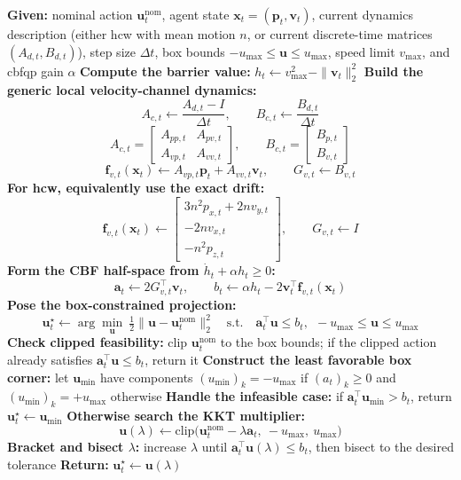 \begin{algorithm}[H]
\footnotesize
\caption{Velocity \acs{cbfqp} Saturation Filter}
\label{alg:velocity-cbf-qp}
\begin{algorithmic}[1]
\State \textbf{Given:} nominal action $\mathbf{u}_t^{\mathrm{nom}}$, agent state $\mathbf{x}_t=(\mathbf{p}_t,\mathbf{v}_t)$, current dynamics description (either \acs{hcw} with mean motion $n$, or current discrete-time matrices $(A_{d,t},B_{d,t})$), step size $\Delta t$, box bounds $-u_{\max}\le \mathbf{u}\le u_{\max}$, speed limit $v_{\max}$, and \acs{cbfqp} gain $\alpha$
\State \textbf{Compute the barrier value:} $h_t \leftarrow v_{\max}^2-\|\mathbf{v}_t\|_2^2$
\State \textbf{Build the generic local velocity-channel dynamics:}
\[
A_{c,t}\leftarrow \frac{A_{d,t}-I}{\Delta t},\qquad
B_{c,t}\leftarrow \frac{B_{d,t}}{\Delta t}
\]
\[
A_{c,t} =
\begin{bmatrix}
A_{pp,t} & A_{pv,t}\\
A_{vp,t} & A_{vv,t}
\end{bmatrix},
\qquad
B_{c,t} =
\begin{bmatrix}
B_{p,t}\\
B_{v,t}
\end{bmatrix}
\]
\[
\mathbf{f}_{v,t}(\mathbf{x}_t)\leftarrow
A_{vp,t}\mathbf{p}_t + A_{vv,t}\mathbf{v}_t,
\qquad
G_{v,t}\leftarrow B_{v,t}
\]
\State \textbf{For \acs{hcw}, equivalently use the exact drift:}
\[
\mathbf{f}_{v,t}(\mathbf{x}_t)\leftarrow
\begin{bmatrix}
3n^2 p_{x,t}+2n v_{y,t}\\
-2n v_{x,t}\\
-n^2 p_{z,t}
\end{bmatrix},
\qquad
G_{v,t}\leftarrow I
\]
\State \textbf{Form the CBF half-space from $\dot h_t+\alpha h_t\ge 0$:}
\[
\mathbf{a}_t \leftarrow 2G_{v,t}^\top\mathbf{v}_t,
\qquad
b_t \leftarrow \alpha h_t - 2 \mathbf{v}_t^\top \mathbf{f}_{v,t}(\mathbf{x}_t)
\]
\State \textbf{Pose the box-constrained projection:}
\[
\mathbf{u}_t^\star \leftarrow
\arg\min_{\mathbf{u}}\ \tfrac12\|\mathbf{u}-\mathbf{u}_t^{\mathrm{nom}}\|_2^2
\quad\text{s.t.}\quad
\mathbf{a}_t^\top \mathbf{u} \le b_t,\ \ -u_{\max}\le \mathbf{u}\le u_{\max}
\]
\State \textbf{Check clipped feasibility:} clip $\mathbf{u}_t^{\mathrm{nom}}$ to the box bounds; if the clipped action already satisfies $\mathbf{a}_t^\top \mathbf{u} \le b_t$, return it
\State \textbf{Construct the least favorable box corner:} let $\mathbf{u}_{\min}$ have components $(u_{\min})_k=-u_{\max}$ if $(a_t)_k\ge 0$ and $(u_{\min})_k=+u_{\max}$ otherwise
\State \textbf{Handle the infeasible case:} if $\mathbf{a}_t^\top \mathbf{u}_{\min}>b_t$, return $\mathbf{u}_t^\star\leftarrow \mathbf{u}_{\min}$
\State \textbf{Otherwise search the KKT multiplier:}
\[
\mathbf{u}(\lambda)\leftarrow \mathrm{clip}\!\big(\mathbf{u}_t^{\mathrm{nom}}-\lambda \mathbf{a}_t,\ -u_{\max},\ u_{\max}\big)
\]
\State \textbf{Bracket and bisect $\lambda$:} increase $\lambda$ until $\mathbf{a}_t^\top \mathbf{u}(\lambda)\le b_t$, then bisect to the desired tolerance
\State \textbf{Return:} $\mathbf{u}_t^\star \leftarrow \mathbf{u}(\lambda)$
\end{algorithmic}
\end{algorithm}

